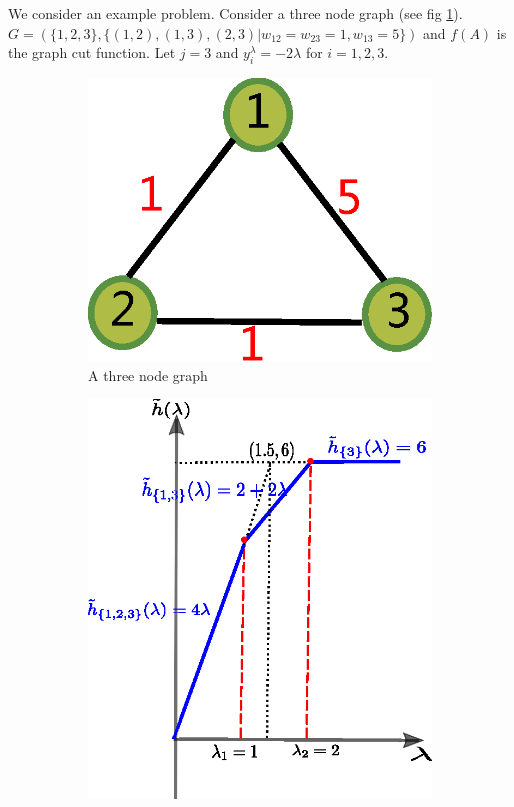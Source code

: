 \documentclass{article}
\begin{document}
\begin{example}\label{ex:3point}
We consider an example problem. Consider a three node graph (see fig \ref{fig:ex}). $G=(\{1,2,3\},\{(1,2),(1,3),(2,3)| w_{12}=w_{23}=1, w_{13}=5\})$ and $f(A)$ is the graph cut function. Let $j=3$ and $y^{\lambda}_i = -2\lambda$ for $i=1,2,3$.
\begin{figure}[!ht]
\centering
\begin{subfigure}{0.45\textwidth}
\includegraphics[width=\textwidth]{pic/example.eps}
\caption{A three node graph}\label{fig:ex}
\end{subfigure}
\begin{subfigure}{0.45\textwidth}
\includegraphics[width=\textwidth]{pic/example_pst.eps}

\end{subfigure}
\end{figure}
\end{example}
\end{document}

